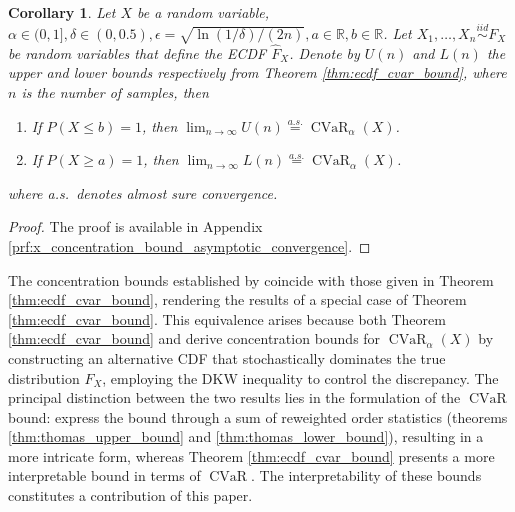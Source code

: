 \documentclass[acmlarge, manuscript, screen, review, natbib=false, oneside]{acmart}
\newtheorem{corollary}[theorem]{Corollary}
\DeclareMathOperator{\CVaR}{CVaR}
\begin{document}
\begin{corollary}\label{thm:x_concentration_bound_asymptotic_convergence}
	Let $X$ be a random variable, $\alpha\in (0, 1],\delta \in (0, 0.5), \epsilon=\sqrt{\ln(1/\delta)/(2n)}, a\in \mathbb{R}, b\in \mathbb{R}$. Let $X_1, \dots, X_n \overset{iid}{\sim} F_X$ be random variables that define the ECDF $\hat{F}_X$. Denote by $U(n)$ and $L(n)$ the upper and lower bounds respectively from Theorem \ref{thm:ecdf_cvar_bound}, where $n$ is the number of samples, then
	\begin{enumerate}
		\item If $P(X\leq b)=1$, then $\lim_{n\rightarrow \infty} U(n)\overset{a.s.}{=}\CVaR_\alpha(X)$.
		\item If $P(X\geq a)=1$, then $\lim_{n\rightarrow \infty} L(n)\overset{a.s.}{=}\CVaR_\alpha(X)$.
	\end{enumerate}
	where a.s.~denotes almost sure convergence.
\end{corollary}
\begin{proof}
	The proof is available in Appendix \ref{prf:x_concentration_bound_asymptotic_convergence}.
\end{proof}
The concentration bounds established by \cite{pmlr-v97-thomas19a} coincide with those given in Theorem \ref{thm:ecdf_cvar_bound}, rendering the results of \cite{pmlr-v97-thomas19a} a special case of Theorem \ref{thm:ecdf_cvar_bound}. This equivalence arises because both Theorem \ref{thm:ecdf_cvar_bound} and \cite{pmlr-v97-thomas19a} derive concentration bounds for $\CVaR_\alpha(X)$ by constructing an alternative CDF that stochastically dominates the true distribution $F_X$, employing the DKW inequality to control the discrepancy. The principal distinction between the two results lies in the formulation of the $\CVaR$ bound: \cite{pmlr-v97-thomas19a} express the bound through a sum of reweighted order statistics (theorems \ref{thm:thomas_upper_bound} and \ref{thm:thomas_lower_bound}), resulting in a more intricate form, whereas Theorem \ref{thm:ecdf_cvar_bound} presents a more interpretable bound in terms of $\CVaR$. The interpretability of these bounds constitutes a contribution of this paper.
\end{document}
